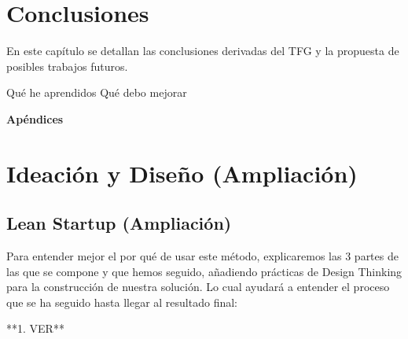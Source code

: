 \documentclass[12pt,twoside,titlepage]{report}
\newcommand\blankpage{%
    \newpage
    \null
    \thispagestyle{empty}%
    \newpage}
\begin{document}
\newpage

\chapter{Conclusiones}

En este capítulo se detallan las conclusiones derivadas del TFG y la propuesta de posibles trabajos futuros.

Qué he aprendidos
Qué debo mejorar

\blankpage




{}
\footnotesize{
%


}
\raggedbottom
\afterpage{\blankpage}
\newpage



\appendix
{}
{}
\mbox{}
\vfill
\begin{center}
\begin{Huge}
\textbf{Apéndices}
\end{Huge}
\end{center}
\vfill
\mbox{}
\thispagestyle{empty}
\newpage
\mbox{}
\thispagestyle{empty}
\newpage

\chapter{Ideación y Diseño (Ampliación)}

\section{Lean Startup (Ampliación)}
\label{sec:apendice}

Para entender mejor el por qué de usar este método, explicaremos las 3 partes de las que se compone y que hemos seguido, añadiendo prácticas de Design Thinking para la construcción de nuestra solución. Lo cual ayudará a entender el proceso que se ha seguido hasta llegar al resultado final:

**1. VER**
\end{document}
